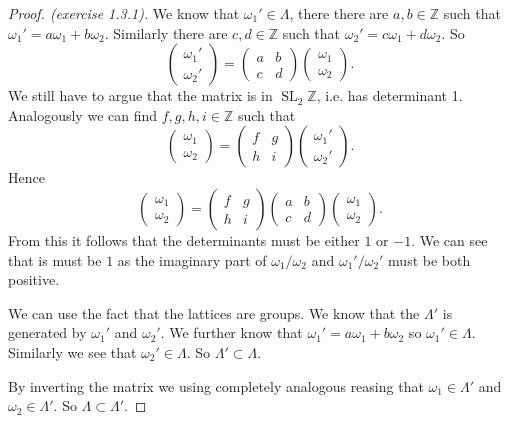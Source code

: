 \documentclass[a4paper]{article}
\theoremstyle{theoremdd}
\theoremstyle{definitiondd}
\theoremstyle{remarkdd}
\newcommand{\Z}{\mathbb{Z}}
\newcommand{\ltr}{\par \noindent \framebox[1\width]{ $\implies$ } \hspace{.2cm}}
\newcommand{\rtl}{\par \noindent \framebox[1\width]{ $\impliedby$ } \hspace{.2cm} }
\DeclareMathOperator{\SL}{SL}
\begin{document}
\begin{proof}[Proof. (exercise 1.3.1)]
	\ltr
	We know that $\omega_1' \in \Lambda$, there there are $a, b \in \Z$ such that $\omega_1' = a \omega_1 + b \omega_2$. Similarly there are $c, d \in \Z$ such that $\omega_2' = c \omega_1 + d \omega_2$. 
	So  \[
	\begin{pmatrix} \omega_1' \\ \omega_2' \end{pmatrix}  = 
	\begin{pmatrix} a & b \\ c& d \end{pmatrix} 
	\begin{pmatrix} \omega_1 \\ \omega_2 \end{pmatrix} 
	.\] 
	We still have to argue that the matrix is in $\SL_2\Z$, i.e. has determinant 1. 
	Analogously we can find $f, g, h, i \in \Z$ such that \[
	\begin{pmatrix} \omega_1  \\ \omega_2 \end{pmatrix}  = 
	\begin{pmatrix} f & g \\ h& i \end{pmatrix} 
	\begin{pmatrix} \omega_1' \\ \omega_2' \end{pmatrix} 
	.\]
	Hence \[
	\begin{pmatrix} \omega_1 \\ \omega_2 \end{pmatrix}  = 
	\begin{pmatrix} f & g \\ h & i \end{pmatrix} 
	\begin{pmatrix} a & b \\ c & d  \end{pmatrix} 
	\begin{pmatrix} \omega_1 \\ \omega_2 \end{pmatrix} 
	.\]  
	From this it follows that the determinants must be either $1$ or $-1$. 
	We can see that is must be $1$ as the imaginary part of $\omega_1 / \omega_2$ and $\omega_1' / \omega_2'$ must be both positive.
	\rtl
	We can use the fact that the lattices are groups. We know that the $\Lambda'$ is generated by $\omega_1'$ and $\omega_2'$.
	We further know that $\omega_1' = a \omega_1 + b \omega_2$ so $\omega_1' \in \Lambda$. 
	Similarly we see that $\omega_2' \in \Lambda$.
	So $\Lambda' \subset  \Lambda$.

	By inverting the matrix we using completely analogous reasing that $\omega_1 \in \Lambda'$ and $\omega_2 \in \Lambda'$. So $\Lambda \subset \Lambda'$.
\end{proof}
\end{document}
